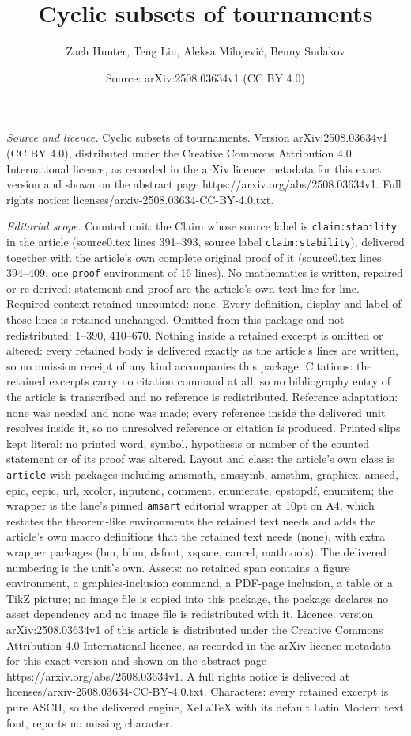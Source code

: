 \documentclass[10pt,a4paper]{amsart}
\title[Cyclic subsets of tournaments]{Cyclic subsets of tournaments}
\author{Zach Hunter, Teng Liu, Aleksa Milojevi\'c, Benny Sudakov}
\date{Source: arXiv:2508.03634v1 (CC BY 4.0)}
\begin{document}
\maketitle

\noindent\emph{Source and licence.} Cyclic subsets of tournaments. Version arXiv:2508.03634v1 (CC BY 4.0), distributed under the Creative Commons Attribution 4.0 International licence, as recorded in the arXiv licence metadata for this exact version and shown on the abstract page https://arxiv.org/abs/2508.03634v1. Full rights notice: licenses/arxiv-2508.03634-CC-BY-4.0.txt.\par\smallskip

\noindent\textit{Editorial scope.} Counted unit: the Claim whose source label is \texttt{claim:stability} in the article (source0.tex lines 391--393, source label \texttt{claim:stability}), delivered together with the article's own complete original proof of it (source0.tex lines 394--409, one \texttt{proof} environment of 16 lines). No mathematics is written, repaired or re-derived: statement and proof are the article's own text line for line. Required context retained uncounted: none. Every definition, display and label of those lines is retained unchanged. Omitted from this package and not redistributed: 1--390, 410--670. Nothing inside a retained excerpt is omitted or altered: every retained body is delivered exactly as the article's lines are written, so no omission receipt of any kind accompanies this package. Citations: the retained excerpts carry no citation command at all, so no bibliography entry of the article is transcribed and no reference is redistributed. Reference adaptation: none was needed and none was made; every reference inside the delivered unit resolves inside it, so no unresolved reference or citation is produced. Printed slips kept literal: no printed word, symbol, hypothesis or number of the counted statement or of its proof was altered. Layout and class: the article's own class is \texttt{article} with packages including amsmath, amssymb, amsthm, graphicx, amscd, epic, eepic, url, xcolor, inputenc, comment, enumerate, epstopdf, enumitem; the wrapper is the lane's pinned \texttt{amsart} editorial wrapper at 10pt on A4, which restates the theorem-like environments the retained text needs and adds the article's own macro definitions that the retained text needs (none), with extra wrapper packages (bm, bbm, dsfont, xspace, cancel, mathtools). The delivered numbering is the unit's own. Assets: no retained span contains a figure environment, a graphics-inclusion command, a PDF-page inclusion, a table or a TikZ picture; no image file is copied into this package, the package declares no asset dependency and no image file is redistributed with it. Licence: version arXiv:2508.03634v1 of this article is distributed under the Creative Commons Attribution 4.0 International licence, as recorded in the arXiv licence metadata for this exact version and shown on the abstract page https://arxiv.org/abs/2508.03634v1. A full rights notice is delivered at licenses/arxiv-2508.03634-CC-BY-4.0.txt. Characters: every retained excerpt is pure ASCII, so the delivered engine, XeLaTeX with its default Latin Modern text font, reports no missing character.
\end{document}
